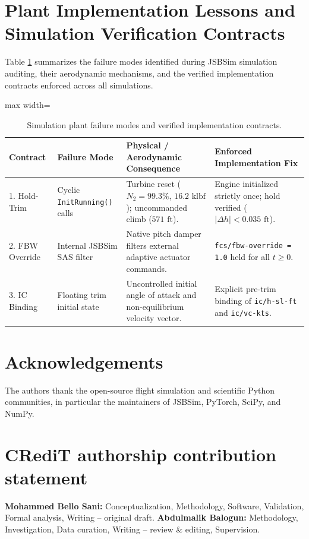\documentclass[review,12pt]{elsarticle}
\begin{document}
\appendix
\gdef\thesection{\Alph{section}}
\section{Plant Implementation Lessons and Simulation Verification Contracts}
\label{sec:appendix}

Table \ref{tab:plant_contracts} summarizes the failure modes identified during JSBSim simulation auditing, their aerodynamic mechanisms, and the verified implementation contracts enforced across all simulations.

\begin{table}[!htbp]
\centering
\caption{Simulation plant failure modes and verified implementation contracts.}
\label{tab:plant_contracts}
\scriptsize
\setlength{\tabcolsep}{3pt}
\begin{adjustbox}{max width=\textwidth}
\begin{tabular}{llll}
\toprule
Contract & Failure Mode & Physical / Aerodynamic Consequence & Enforced Implementation Fix \\
\midrule
1. Hold-Trim & Cyclic \texttt{InitRunning()} calls & Turbine reset ($N_2=99.3\%$, $16.2\text{ klbf}$); uncommanded climb ($571\text{ ft}$). & Engine initialized strictly once; hold verified ($|\Delta h| < 0.035\text{ ft}$). \\
2. FBW Override & Internal JSBSim SAS filter & Native pitch damper filters external adaptive actuator commands. & \texttt{fcs/fbw-override = 1.0} held for all $t \ge 0$. \\
3. IC Binding & Floating trim initial state & Uncontrolled initial angle of attack and non-equilibrium velocity vector. & Explicit pre-trim binding of \texttt{ic/h-sl-ft} and \texttt{ic/vc-kts}. \\
\bottomrule
\end{tabular}
\end{adjustbox}
\end{table}

\section*{Acknowledgements}
The authors thank the open-source flight simulation and scientific Python communities, in particular the maintainers of JSBSim, PyTorch, SciPy, and NumPy.

\section*{CRediT authorship contribution statement}
\textbf{Mohammed Bello Sani:} Conceptualization, Methodology, Software, Validation, Formal analysis, Writing – original draft.
\textbf{Abdulmalik Balogun:} Methodology, Investigation, Data curation, Writing – review \& editing, Supervision.
\end{document}
